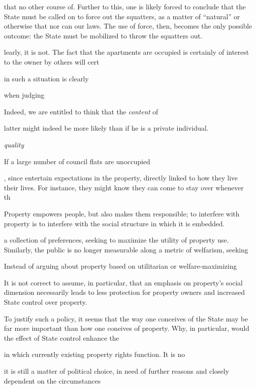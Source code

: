that no other course of. Further to this, one is likely forced to conclude that the State must be called on to force out the squatters, as a matter of ``natural'' or otherwise  that nor can our laws. The use of force, then, becomes the only possible outcome: the State must be mobilized to throw the squatters out. 





learly, it is not. The fact that the apartments are occupied is certainly of interest to the owner by others will cert

in such a situation is clearly 


when judging 

 Indeed, we are entitled to think that the {\it content} of 

 latter might indeed be more likely than if he is a private individual.


 {\it quality} 

If a large number of council flats are unoccupied 




 , since  entertain expectations in the property, directly linked to how they live their lives. For instance, they might know they can come to stay over whenever th



 Property empowers people,  but also makes them responsible; to interfere with property is to interfere with the social structure in which it is embedded.

a collection of preferences, seeking to maximize the utility of property use. Similarly, the public is no longer measurable along a metric of welfarism, seeking 


Instead of arguing about property based on utilitarian or welfare-maximizing 






 It is not correct to assume, in particular, that an emphasis on property's social dimension necessarily leads to less protection for property owners and increased State control over property. 

To justify such a policy, it seems that the way one conceives of the State may be far more important than how one coneives of property. Why, in particular, would the effect of State control enhance the 

 in which currently existing property rights function. It is no 

it is still a matter of political choice, in need of further reasons and closely dependent on the circumstances 




